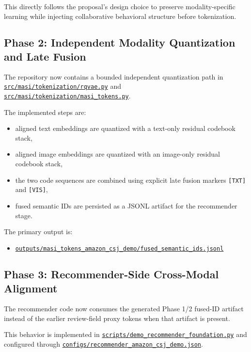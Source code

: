 \documentclass[11pt]{article}
\begin{document}
This directly follows the proposal's design choice to preserve modality-specific learning while injecting collaborative behavioral structure before tokenization.

\subsection{Phase 2: Independent Modality Quantization and Late Fusion}
The repository now contains a bounded independent quantization path in
\href{/Users/pradyundevarakonda/Developer/MASI/src/masi/tokenization/rqvae.py}{\texttt{src/masi/tokenization/rqvae.py}} and
\href{/Users/pradyundevarakonda/Developer/MASI/src/masi/tokenization/masi_tokens.py}{\texttt{src/masi/tokenization/masi\_tokens.py}}.

The implemented steps are:
\begin{itemize}[leftmargin=1.5em]
    \item aligned text embeddings are quantized with a text-only residual codebook stack,
    \item aligned image embeddings are quantized with an image-only residual codebook stack,
    \item the two code sequences are combined using explicit late fusion markers \texttt{[TXT]} and \texttt{[VIS]},
    \item fused semantic IDs are persisted as a JSONL artifact for the recommender stage.
\end{itemize}

The primary output is:
\begin{itemize}[leftmargin=1.5em]
    \item \href{/Users/pradyundevarakonda/Developer/MASI/outputs/masi_tokens_amazon_csj_demo/fused_semantic_ids.jsonl}{\texttt{outputs/masi\_tokens\_amazon\_csj\_demo/fused\_semantic\_ids.jsonl}}
\end{itemize}

\subsection{Phase 3: Recommender-Side Cross-Modal Alignment}
The recommender code now consumes the generated Phase 1/2 fused-ID artifact instead of the earlier review-field proxy tokens when that artifact is present.

This behavior is implemented in
\href{/Users/pradyundevarakonda/Developer/MASI/scripts/demo_recommender_foundation.py}{\texttt{scripts/demo\_recommender\_foundation.py}}
and configured through
\href{/Users/pradyundevarakonda/Developer/MASI/configs/recommender_amazon_csj_demo.json}{\texttt{configs/recommender\_amazon\_csj\_demo.json}}.
\end{document}
